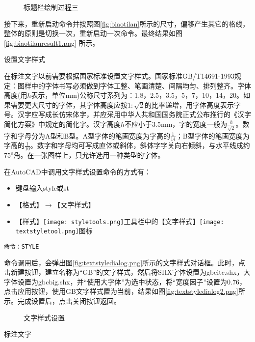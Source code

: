 \begin{procedure}
\begin{figure}[htbp]
\centering
{}\hspace{30pt}
\caption{标题栏绘制过程三}
\end{figure}

接下来，重新启动命令并按照图\ref{fig:biaotilan}所示的尺寸，偏移产生其它的格线，整体的原则是切换一次，重新启动一次命令。最终结果如图\ref{fig:biaotilanresult1.png} 所示。
\item 设置文字样式

在标注文字以前需要根据国家标准设置文字样式。国家标准GB/T14691-1993规定：图样中的字体书写必须做到字体工整、笔画清楚、间隔均匀、排列整齐。字体高度(用$h$表示，单位mm)公称尺寸系列为：1.8，2.5，3.5，5，7，10，14，20。如果需要更大尺寸的字体，其字体高度应按$1:\sqrt{2}$的比率递增，用字体高度表示字号。汉字应写成长仿宋体字，并应采用中华人共和国国务院正式公布推行的《汉字简化方案》中规定的简化字。汉字高度$h$不应小于3.5mm，字的宽度一般为$\frac{h}{\sqrt{2}}$。数字和字母分为A型和B型。A型字体的笔画宽度为字高的$\frac{1}{14}$；B型字体的笔画宽度为字高的$\frac{1}{10}$。数字和字母均可写成直体或斜体，斜体字字关向右倾斜，与水平线成约$75^o$角。在一张图样上，只允许选用一种类型的字体。

在AutoCAD中调用文字样式设置命令的方式有：
\begin{itemize}
\item 键盘输入style或st
\item 【格式】$\rightarrow$【文字样式】
\item 【样式】\texttt{[image: styletools.png]}工具栏中的【文字样式】\texttt{[image: textstyletool.png]}图标
\end{itemize}

\begin{lstlisting}
命令：STYLE
\end{lstlisting}
命令调用后，会弹出图\ref{fig:textstyledialog.png}所示的文字样式对话框。此时，点击新建按钮，建立名称为“GB”的文字样式，然后将SHX字体设置为gbeitc.shx，大字体设置为gbcbig.shx，并“使用大字体”为选中状态，将“宽度因子”设置为0.76，点击应用按钮，使用GB文字样式置为当前，结果如图\ref{fig:textstyledialog2.png}所示。完成设置后，点击关闭按钮返回。
\begin{figure}[htbp]
\centering
{}\hspace{20pt}
\caption{文字样式设置}
\end{figure}
\item 标注文字


\end{procedure}
